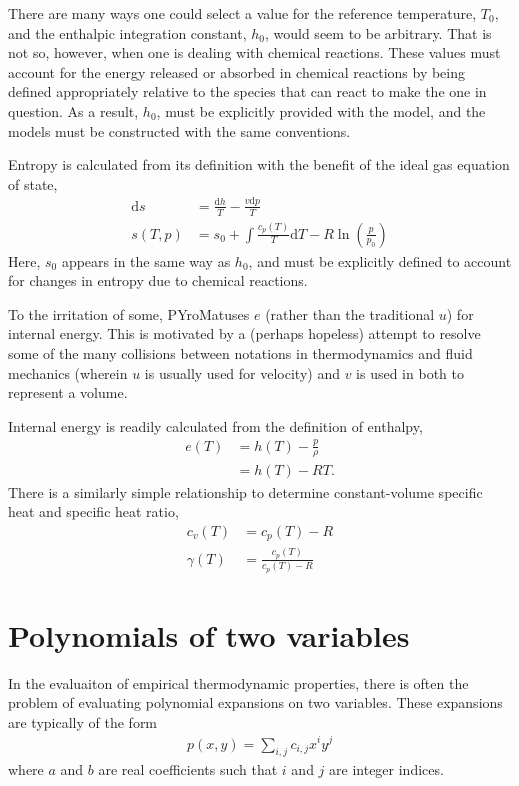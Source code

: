 \documentclass[twocolumn,letterpaper,11pt]{article}
\def\pm{PYroMat}
\def\d{\mathrm{d}}
\begin{document}
There are many ways one could select a value for the reference temperature, $T_0$, and the enthalpic integration constant, $h_0$, would seem to be arbitrary.  That is not so, however, when one is dealing with chemical reactions.  These values must account for the energy released or absorbed in chemical reactions by being defined appropriately relative to the species that can react to make the one in question.  As a result, $h_0$, must be explicitly provided with the model, and the models must be constructed with the same conventions.

Entropy is calculated from its definition with the benefit of the ideal gas equation of state,
\begin{align} 
\d s &= \frac{\d h}{T} - \frac{v \d p}{T}\nonumber\\
s(T,p) &= s_0 + \int \frac{c_p(T)}{T} \d T - R \ln\left(\frac{p}{p_0}\right)
\end{align}
Here, $s_0$ appears in the same way as $h_0$, and must be explicitly defined to account for changes in entropy due to chemical reactions.

To the irritation of some, \pm uses $e$ (rather than the traditional $u$) for internal energy.  This is motivated by a (perhaps hopeless) attempt to resolve some of the many collisions between notations in thermodynamics and fluid mechanics (wherein $u$ is usually used for velocity) and $v$ is used in both to represent a volume.  

Internal energy is readily calculated from the definition of enthalpy,
\begin{align}
e(T) &= h(T) - \frac{p}{\rho}\nonumber\\
 &= h(T) - R T.
\end{align}
There is a similarly simple relationship to determine constant-volume specific heat and specific heat ratio,
\begin{align}
c_v(T) &= c_p(T) - R\\
\gamma(T) &= \frac{c_p(T)}{c_p(T)-R}
\end{align}



\section{Polynomials of two variables}
In the evaluaiton of empirical thermodynamic properties, there is often the problem of evaluating polynomial expansions on two variables.  These expansions are typically of the form
\begin{align}
p(x,y) = \sum_{i,j} c_{i,j} x^i y^j\label{eqn:general}
\end{align}
where $a$ and $b$ are real coefficients such that $i$ and $j$ are integer indices.
\end{document}

